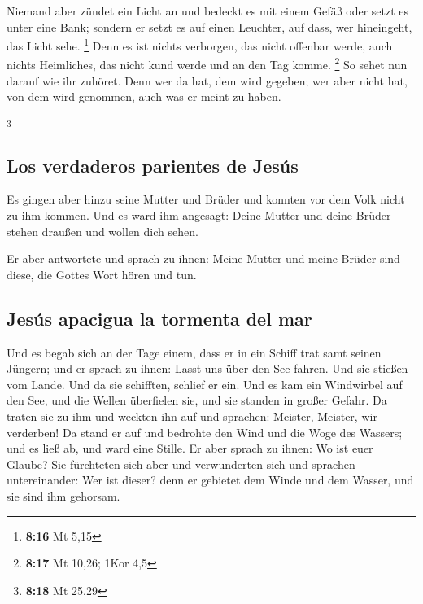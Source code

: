  Niemand aber zündet ein Licht an und bedeckt es mit
einem Gefäß oder setzt es unter eine Bank; sondern er setzt es auf einen
Leuchter, auf dass, wer hineingeht, das Licht sehe. \footnote{\textbf{8:16}
  Mt 5,15}  Denn es ist nichts verborgen, das nicht
offenbar werde, auch nichts Heimliches, das nicht kund werde und an den
Tag komme. \footnote{\textbf{8:17} Mt 10,26; 1Kor 4,5} 
So sehet nun darauf wie ihr zuhöret. Denn wer da hat, dem wird gegeben;
wer aber nicht hat, von dem wird genommen, auch was er meint zu haben.

\footnote{\textbf{8:18} Mt 25,29}

\hypertarget{los-verdaderos-parientes-de-jesuxfas}{%
\subsection{Los verdaderos parientes de
Jesús}\label{los-verdaderos-parientes-de-jesuxfas}}

 Es gingen aber hinzu seine Mutter und Brüder und konnten
vor dem Volk nicht zu ihm kommen.  Und es ward ihm
angesagt: Deine Mutter und deine Brüder stehen draußen und wollen dich
sehen.

 Er aber antwortete und sprach zu ihnen: Meine Mutter und
meine Brüder sind diese, die Gottes Wort hören und tun.

\hypertarget{jesuxfas-apacigua-la-tormenta-del-mar}{%
\subsection{Jesús apacigua la tormenta del
mar}\label{jesuxfas-apacigua-la-tormenta-del-mar}}

 Und es begab sich an der Tage einem, dass er in ein
Schiff trat samt seinen Jüngern; und er sprach zu ihnen: Lasst uns über
den See fahren. Und sie stießen vom Lande.  Und da sie
schifften, schlief er ein. Und es kam ein Windwirbel auf den See, und
die Wellen überfielen sie, und sie standen in großer Gefahr.
 Da traten sie zu ihm und weckten ihn auf und sprachen:
Meister, Meister, wir verderben! Da stand er auf und bedrohte den Wind
und die Woge des Wassers; und es ließ ab, und ward eine Stille.
 Er aber sprach zu ihnen: Wo ist euer Glaube? Sie
fürchteten sich aber und verwunderten sich und sprachen untereinander:
Wer ist dieser? denn er gebietet dem Winde und dem Wasser, und sie sind
ihm gehorsam.

